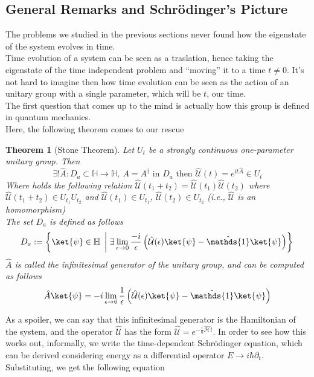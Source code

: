 \documentclass[a4paper, 11pt]{book}
\newcommand{\1}{\opr{\mathds{1}}}
\newcommand{\ham}{\mathcal{H}}
\newcommand{\opr}[1]{\hat{#1}}
\newcommand{\adj}[2][]{#2^{\dagger#1}}
\newcommand{\U}{\opr{\mathcal{U}}}
\newtheorem{thm}{Theorem}
\theoremstyle{plain}
\begin{document}
	\subsection{General Remarks and Schrödinger's Picture}
	The problems we studied in the previous sections never found how the eigenstate of the system evolves in time.\\
	Time evolution of a system can be seen as a traslation, hence taking the eigenstate of the time independent problem and ``moving'' it to a time $t\ne0$. It's not hard to imagine then how time evolution can be seen as the action of an unitary group with a single parameter, which will be $t$, our time.\\
	The first question that comes up to the mind is actually how this group is defined in quantum mechanics.\\
	Here, the following theorem comes to our rescue
	\begin{thm}[Stone Theorem]
		Let $U_t$ be a strongly continuous one-parameter unitary group. Then
		\begin{equation*}
			\exists!\opr{A}:D_a\subset\mathbb{H}\to\mathbb{H},\ A=\adj{A}\text{ in }D_a\text{ then }\U(t)=e^{it\opr{A}}\in U_t
		\end{equation*}
		Where holds the following relation $\U(t_1+t_2)=\U(t_1)\U(t_2)$ where $\U(t_1+t_2)\in U_{t_1}U_{t_2}$ and $\U(t_1)\in U_{t_1}$, $\U(t_2)\in U_{t_2}$ (i.e., $\U$ is an homomorphism)\\
		The set $D_a$ is defined as follows
		\begin{equation*}
		D_a:=\left\{ \ket{\psi}\in\mathbb{H}\ \left|\ \exists\lim_{\epsilon\to0}\frac{-i}{\epsilon}\left( \U(\epsilon)\ket{\psi}-\1\ket{\psi} \right) \right\}\right.
		\end{equation*}
		$\opr{A}$ is called the infinitesimal generator of the unitary group, and can be computed as follows
		\begin{equation*}
			\opr{A}\ket{\psi}=-i\lim_{\epsilon\to0}\frac{1}{\epsilon}\left( \U(\epsilon)\ket{\psi}-\1\ket{\psi} \right)
		\end{equation*}
	\end{thm}
	As a spoiler, we can say that this infinitesimal generator is the Hamiltonian of the system, and the operator $\U$ has the form $\U=e^{-\frac{i}{\hbar}\opr{\ham}t}$. In order to see how this works out, informally, we write the time-dependent Schrödinger equation, which can be derived considering energy as a differential operator $E\to i\hbar\partial_t$. Substituting, we get the following equation
\end{document}
